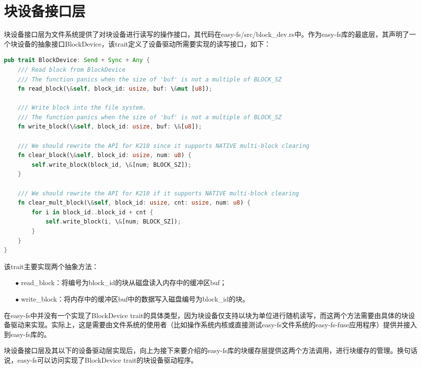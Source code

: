 \section{块设备接口层}

块设备接口层为文件系统提供了对块设备进行读写的操作接口，其代码在easy-fs/src/block\_dev.rs中。作为easy-fs库的最底层，其声明了一个块设备的抽象接口BlockDevice，该trait定义了设备驱动所需要实现的读写接口，如下：

\begin{lstlisting}[language={Rust}, label={code:blockdevice},
	caption={easy-fs/src/block\_dev.rs}]
pub trait BlockDevice: Send + Sync + Any {
	/// Read block from BlockDevice
	/// The function panics when the size of 'buf' is not a multiple of BLOCK_SZ
	fn read_block(\&self, block_id: usize, buf: \&mut [u8]);
	
	/// Write block into the file system.
	/// The function panics when the size of 'buf' is not a multiple of BLOCK_SZ
	fn write_block(\&self, block_id: usize, buf: \&[u8]);
	
	/// We should rewrite the API for K210 since it supports NATIVE multi-block clearing
	fn clear_block(\&self, block_id: usize, num: u8) {
		self.write_block(block_id, \&[num; BLOCK_SZ]);
	}
	
	/// We should rewrite the API for K210 if it supports NATIVE multi-block clearing
	fn clear_mult_block(\&self, block_id: usize, cnt: usize, num: u8) {
		for i in block_id..block_id + cnt {
			self.write_block(i, \&[num; BLOCK_SZ]);
		}
	}
}
\end{lstlisting}

该trait主要实现两个抽象方法：

\begin{itemize}
	\item [$\bullet$]
	read\_block：将编号为block\_id的块从磁盘读入内存中的缓冲区buf；
	\item [$\bullet$]
	write\_block：将内存中的缓冲区buf中的数据写入磁盘编号为block\_id的块。
\end{itemize}

在easy-fs中并没有一个实现了BlockDevice trait的具体类型，因为块设备仅支持以块为单位进行随机读写，而这两个方法需要由具体的块设备驱动来实现。实际上，这是需要由文件系统的使用者（比如操作系统内核或直接测试easy-fs文件系统的easy-fs-fuse应用程序）提供并接入到easy-fs库的。

块设备接口层及其以下的设备驱动层实现后，向上为接下来要介绍的easy-fs库的块缓存层提供这两个方法调用，进行块缓存的管理。换句话说，easy-fs可以访问实现了BlockDevice trait的块设备驱动程序。

